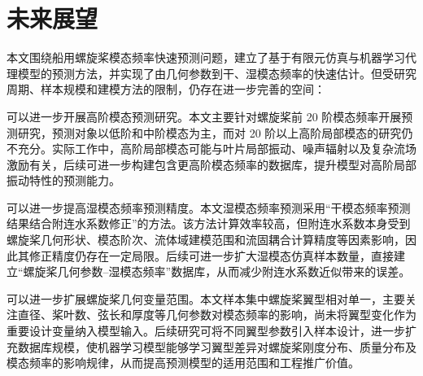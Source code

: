 \section{未来展望}

本文围绕船用螺旋桨模态频率快速预测问题，建立了基于有限元仿真与机器学习代理模型的预测方法，并实现了由几何参数到干、湿模态频率的快速估计。但受研究周期、样本规模和建模方法的限制，仍存在进一步完善的空间：

可以进一步开展高阶模态预测研究。本文主要针对螺旋桨前 20 阶模态频率开展预测研究，预测对象以低阶和中阶模态为主，而对 20 阶以上高阶局部模态的研究仍不充分。实际工作中，高阶局部模态可能与叶片局部振动、噪声辐射以及复杂流场激励有关，后续可进一步构建包含更高阶模态频率的数据库，提升模型对高阶局部振动特性的预测能力。

可以进一步提高湿模态频率预测精度。本文湿模态频率预测采用“干模态频率预测结果结合附连水系数修正”的方法。该方法计算效率较高，但附连水系数本身受到螺旋桨几何形状、模态阶次、流体域建模范围和流固耦合计算精度等因素影响，因此其修正精度仍存在一定局限。后续可进一步扩大湿模态仿真样本数量，直接建立“螺旋桨几何参数--湿模态频率”数据库，从而减少附连水系数近似带来的误差。

可以进一步扩展螺旋桨几何变量范围。本文样本集中螺旋桨翼型相对单一，主要关注直径、桨叶数、弦长和厚度等几何参数对模态频率的影响，尚未将翼型变化作为重要设计变量纳入模型输入。后续研究可将不同翼型参数引入样本设计，进一步扩充数据库规模，使机器学习模型能够学习翼型差异对螺旋桨刚度分布、质量分布及模态频率的影响规律，从而提高预测模型的适用范围和工程推广价值。

